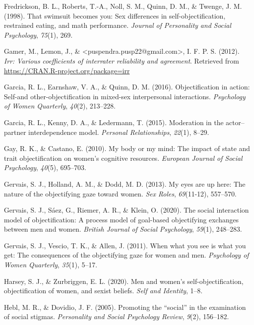 \documentclass[
  man]{apa6}
\begin{document}
\hypertarget{ref-fredrickson1998swimsuit}{}
Fredrickson, B. L., Roberts, T.-A., Noll, S. M., Quinn, D. M., \&
Twenge, J. M. (1998). That swimsuit becomes you: Sex differences in
self-objectification, restrained eating, and math performance.
\emph{Journal of Personality and Social Psychology}, \emph{75}(1), 269.

\hypertarget{ref-R-irr}{}
Gamer, M., Lemon, J., \&
\textless{}puspendra.pusp22@gmail.com\textgreater{}, I. F. P. S. (2012).
\emph{Irr: Various coefficients of interrater reliability and
agreement}. Retrieved from \url{https://CRAN.R-project.org/package=irr}

\hypertarget{ref-garcia2016objectification}{}
Garcia, R. L., Earnshaw, V. A., \& Quinn, D. M. (2016). Objectification
in action: Self-and other-objectification in mixed-sex interpersonal
interactions. \emph{Psychology of Women Quarterly}, \emph{40}(2),
213--228.

\hypertarget{ref-garcia2015moderation}{}
Garcia, R. L., Kenny, D. A., \& Ledermann, T. (2015). Moderation in the
actor--partner interdependence model. \emph{Personal Relationships},
\emph{22}(1), 8--29.

\hypertarget{ref-gay2010my}{}
Gay, R. K., \& Castano, E. (2010). My body or my mind: The impact of
state and trait objectification on women's cognitive resources.
\emph{European Journal of Social Psychology}, \emph{40}(5), 695--703.

\hypertarget{ref-gervais2013my}{}
Gervais, S. J., Holland, A. M., \& Dodd, M. D. (2013). My eyes are up
here: The nature of the objectifying gaze toward women. \emph{Sex
Roles}, \emph{69}(11-12), 557--570.

\hypertarget{ref-gervais2020social}{}
Gervais, S. J., Sáez, G., Riemer, A. R., \& Klein, O. (2020). The social
interaction model of objectification: A process model of goal-based
objectifying exchanges between men and women. \emph{British Journal of
Social Psychology}, \emph{59}(1), 248--283.

\hypertarget{ref-gervais2011you}{}
Gervais, S. J., Vescio, T. K., \& Allen, J. (2011). When what you see is
what you get: The consequences of the objectifying gaze for women and
men. \emph{Psychology of Women Quarterly}, \emph{35}(1), 5--17.

\hypertarget{ref-harsey2020men}{}
Harsey, S. J., \& Zurbriggen, E. L. (2020). Men and women's
self-objectification, objectification of women, and sexist beliefs.
\emph{Self and Identity}, 1--8.

\hypertarget{ref-hebl2005promoting}{}
Hebl, M. R., \& Dovidio, J. F. (2005). Promoting the ``social'' in the
examination of social stigmas. \emph{Personality and Social Psychology
Review}, \emph{9}(2), 156--182.
\end{document}
